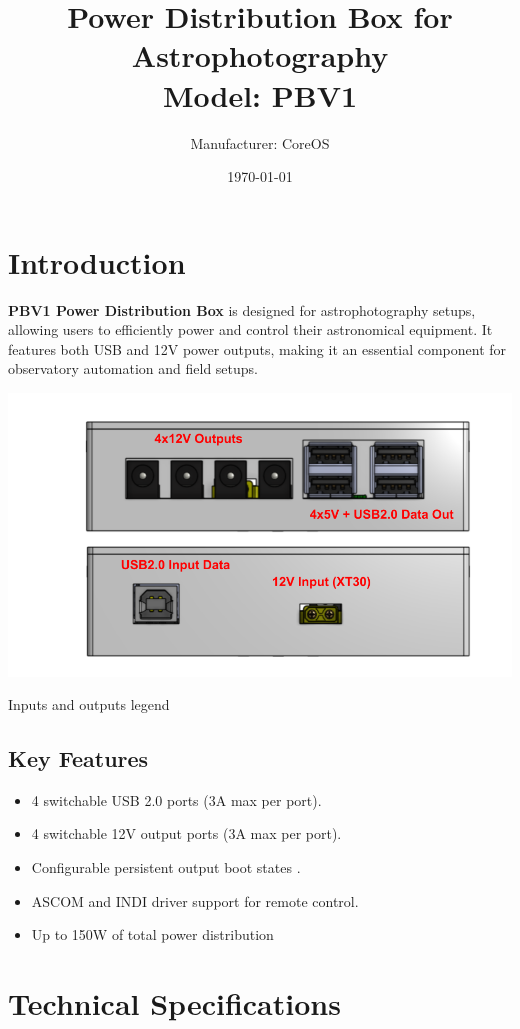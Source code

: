 \documentclass[a4paper,10pt,twocolumn]{article}
\title{\textbf{Power Distribution Box for Astrophotography}\\\large Model: PBV1}
\author{Manufacturer: CoreOS}
\date{\today}
\begin{document}
\maketitle

\section*{Introduction}
\textbf{PBV1 Power Distribution Box} is designed for astrophotography setups, allowing users to efficiently power and control their astronomical equipment. It features both USB and 12V power outputs, making it an essential component for observatory automation and field setups.


\begin{center}
   \includegraphics[width=1\columnwidth]{figures/PBV1in_outs.png} %
   \caption{Inputs and outputs legend }
\end{center}


\subsection*{Key Features}
\begin{itemize}
    \item 4 switchable USB 2.0 ports (3A max per port).
    \item 4 switchable 12V output ports (3A max per port).
    \item Configurable persistent output boot states .
    \item ASCOM and INDI driver support for remote control.
    \item Up to 150W of total power distribution
\end{itemize}

\section*{Technical Specifications}
\end{document}
